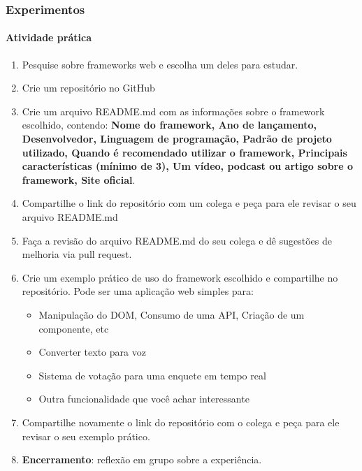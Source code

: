 \documentclass[
	9pt, %
	t, %
]{beamer}
\begin{document}
\begin{frame}
	\frametitle{Experimentos}
	\framesubtitle{Atividade prática}

	\begin{enumerate}
		\item Pesquise sobre frameworks web e escolha um deles para estudar.
		\item Crie um repositório no GitHub
		\item Crie um arquivo README.md com as informações sobre o framework escolhido, contendo: {\small \textbf{Nome do framework, Ano de lançamento, Desenvolvedor, Linguagem de programação, Padrão de projeto utilizado, Quando é recomendado utilizar o framework, Principais características (mínimo de 3), Um vídeo, podcast ou artigo sobre o framework, Site oficial}}.
		\item Compartilhe o link do repositório com um colega e peça para ele revisar o seu arquivo README.md
		\item Faça a revisão do arquivo README.md do seu colega e dê sugestões de melhoria via pull request.
		\item Crie um exemplo prático de uso do framework escolhido e compartilhe no repositório. Pode ser uma aplicação web simples para:
		\begin{itemize}
			\item Manipulação do DOM, Consumo de uma API, Criação de um componente, etc
			\item Converter texto para voz
			\item Sistema de votação para uma enquete em tempo real
			\item Outra funcionalidade que você achar interessante
		\end{itemize}
		\item Compartilhe novamente o link do repositório com o colega e peça para ele revisar o seu exemplo prático.
		\item \textbf{Encerramento}: reflexão em grupo sobre a experiência.
	\end{enumerate}

\end{frame}
\end{document}
